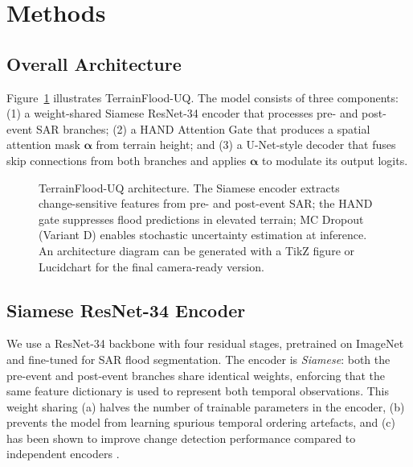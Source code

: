 \documentclass[12pt]{article}
\begin{document}
\section{Methods}
\label{sec:methods}

\subsection{Overall Architecture}

Figure~\ref{fig:architecture} illustrates TerrainFlood-UQ.  The model
consists of three components: (1) a weight-shared Siamese ResNet-34 encoder
that processes pre- and post-event SAR branches; (2) a HAND Attention Gate
that produces a spatial attention mask $\bm{\alpha}$ from terrain height;
and (3) a U-Net-style decoder \cite{ronneberger2015unet} that fuses skip
connections from both branches and applies $\bm{\alpha}$ to modulate its
output logits.

\begin{figure}[h]
\centering
\caption{TerrainFlood-UQ architecture.  The Siamese encoder extracts
change-sensitive features from pre- and post-event SAR; the HAND gate
suppresses flood predictions in elevated terrain; MC Dropout (Variant D)
enables stochastic uncertainty estimation at inference.
An architecture diagram can be generated with a TikZ figure or Lucidchart
for the final camera-ready version.}
\label{fig:architecture}
\end{figure}

\subsection{Siamese ResNet-34 Encoder}

We use a ResNet-34 \cite{he2016deep} backbone with four residual stages,
pretrained on ImageNet and fine-tuned for SAR flood segmentation.  The
encoder is \emph{Siamese}: both the pre-event and post-event branches share
identical weights, enforcing that the same feature dictionary is used to
represent both temporal observations.  This weight sharing (a) halves the
number of trainable parameters in the encoder, (b) prevents the model from
learning spurious temporal ordering artefacts, and (c) has been shown to
improve change detection performance compared to independent encoders
\cite{daudt2018fully}.
\end{document}

